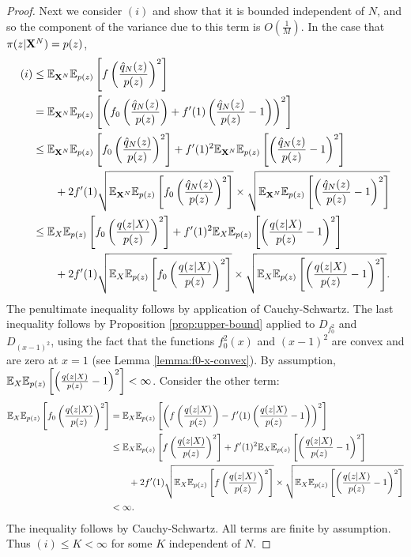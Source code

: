 \begin{proof}
Next we consider $(i)$ and show that it is bounded independent of $N$, and so the component of the variance due to this term is $O\left(\frac{1}{M}\right)$.
In the case that $\pi(z|\mathbf{X}^N) = p(z)$,
\begin{align*}
(i) &\leq \mathbb{E}_{\mathbf{X}^N} \mathbb{E}_{p(z)} \left[ f\left( \frac{\hat{q}_N(z)}{p(z)} \right)^2\right]\\
&= \mathbb{E}_{\mathbf{X}^N} \mathbb{E}_{p(z)} \left[ \left( f_0\left( \frac{\hat{q}_N(z)}{p(z)} \right) + f'(1) \left( \frac{\hat{q}_N(z)}{p(z)} - 1 \right) \right)^2\right] \\
&\leq \mathbb{E}_{\mathbf{X}^N} \mathbb{E}_{p(z)} \left[  f_0\left( \frac{\hat{q}_N(z)}{p(z)} \right)^2\right] 
+
 f'(1)^2 \mathbb{E}_{\mathbf{X}^N} \mathbb{E}_{p(z)} \left[  \left( \frac{\hat{q}_N(z)}{p(z)} - 1 \right)^2\right] \\
 & \qquad + 2f'(1) \sqrt{\mathbb{E}_{\mathbf{X}^N} \mathbb{E}_{p(z)} \left[  f_0\left( \frac{\hat{q}_N(z)}{p(z)} \right)^2\right] } \times \sqrt{\mathbb{E}_{\mathbf{X}^N} \mathbb{E}_{p(z)} \left[  \left( \frac{\hat{q}_N(z)}{p(z)} - 1 \right)^2\right]} \\
&\leq \mathbb{E}_{X} \mathbb{E}_{p(z)} \left[  f_0\left( \frac{q(z|X)}{p(z)} \right)^2\right] 
+
 f'(1)^2 \mathbb{E}_{X} \mathbb{E}_{p(z)} \left[  \left( \frac{q(z|X)}{p(z)} - 1 \right)^2\right] \\
 & \qquad + 2f'(1) \sqrt{\mathbb{E}_{X} \mathbb{E}_{p(z)} \left[  f_0\left( \frac{q(z|X)}{p(z)} \right)^2\right] } \times \sqrt{\mathbb{E}_{X} \mathbb{E}_{p(z)} \left[  \left( \frac{q(z|X)}{p(z)} - 1 \right)^2\right]}.
\end{align*}
The penultimate inequality follows by application of Cauchy-Schwartz.
The last inequality follows by Proposition \ref{prop:upper-bound} applied to $D_{f_0^2}$ and $D_{(x-1)^2}$, 
using the fact that the functions $f_0^2(x)$ and $(x-1)^2$ are convex and are zero at $x=1$ (see Lemma \ref{lemma:f0-x-convex}).
By assumption, $\mathbb{E}_{X} \mathbb{E}_{p(z)} \left[  \left( \frac{q(z|X)}{p(z)} - 1 \right)^2\right] < \infty$. 
Consider the other term:
\begin{align*}
    \mathbb{E}_{X} \mathbb{E}_{p(z)} \left[  f_0\left( \frac{q(z|X)}{p(z)} \right)^2\right]
    &= \mathbb{E}_{X} \mathbb{E}_{p(z)} \left[ \left( f\left( \frac{q(z|X)}{p(z)}\right) - f'(1) \left(\frac{q(z|X)}{p(z)} - 1 \right) \right)^2\right] \\
    &\leq \mathbb{E}_{X} \mathbb{E}_{p(z)} \left[  f\left( \frac{q(z|X)}{p(z)} \right)^2\right] 
    +
    f'(1)^2 \mathbb{E}_{X} \mathbb{E}_{p(z)} \left[  \left( \frac{q(z|X)}{p(z)} - 1 \right)^2\right] \\
    & \qquad + 2f'(1) \sqrt{\mathbb{E}_{X} \mathbb{E}_{p(z)} \left[  f\left( \frac{q(z|X)}{p(z)} \right)^2\right] } \times \sqrt{\mathbb{E}_{X} \mathbb{E}_{p(z)} \left[  \left( \frac{q(z|X)}{p(z)} - 1 \right)^2\right]} \\
    & < \infty.
\end{align*}
The inequality follows by Cauchy-Schwartz.
All terms are finite by assumption.
Thus $(i) \leq K < \infty$ for some $K$ independent of $N$.


\end{proof}
